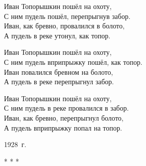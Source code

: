 
\begin{center}
\begin{minipage}{0.5\textwidth}
Иван Топорышкин пошёл на охоту,\\
С ним пудель пошёл, перепрыгнув забор.\\
Иван, как бревно, провалился в болото,\\
А пудель в реке утонул, как топор.\\
\end{minipage}
\end{center}

\begin{center}
\begin{minipage}{0.5\textwidth}
Иван Топорышкин пошёл на охоту,\\
С ним пудель вприпрыжку пошёл, как топор.\\
Иван повалился бревном на болото,\\
А пудель в реке перепрыгнул забор.\\
\end{minipage}
\end{center}

\begin{center}
\begin{minipage}{0.5\textwidth}
Иван Топорышкин пошёл на охоту,\\
С ним пудель в реке провалился в забор.\\
Иван, как бревно, перепрыгнул болото,\\
А пудель вприпрыжку попал на топор.
\end{minipage}
\end{center}

\begin{flushright}
1928~г.
\end{flushright}

\begin{center}
* * *
\end{center}